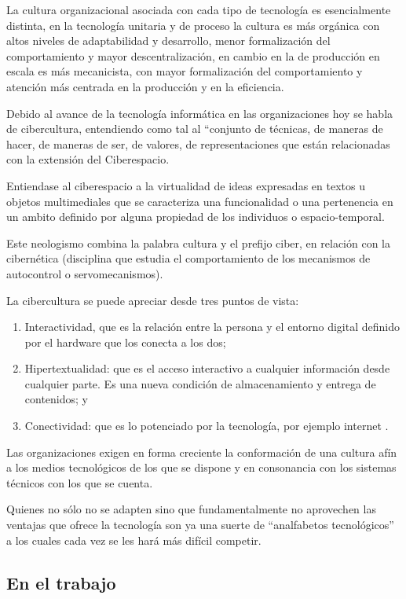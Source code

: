 \documentclass[a4paper, 12pt]{article}
\begin{document}
La cultura organizacional asociada con cada tipo de tecnología es esencialmente distinta, en la tecnología unitaria y de proceso la cultura es más orgánica con altos niveles de adaptabilidad y desarrollo, menor formalización del comportamiento y mayor descentralización, en cambio en la de producción en escala es más mecanicista, con mayor formalización del comportamiento y atención más centrada en la producción y en la eficiencia.

Debido al avance de la tecnología informática en las organizaciones hoy se habla de cibercultura, entendiendo como tal al “conjunto de técnicas, de maneras de hacer, de maneras de ser, de valores, de representaciones que están relacionadas con la extensión del Ciberespacio.

Entiendase al ciberespacio a la virtualidad de ideas expresadas en textos u objetos multimediales  que  se caracteriza una funcionalidad o una pertenencia en un ambito definido por alguna propiedad de los individuos o espacio-temporal.

Este neologismo combina la palabra cultura y el prefijo ciber, en relación con la cibernética (disciplina que estudia el comportamiento de los mecanismos de autocontrol o servomecanismos).

La cibercultura se puede apreciar desde tres puntos de vista:

\begin{enumerate}
\item Interactividad, que es la relación entre la persona y el entorno digital definido por el hardware que los conecta a los dos;
\item Hipertextualidad: que es el acceso interactivo a cualquier información desde cualquier parte. Es una nueva condición de almacenamiento y entrega de contenidos; y
\item Conectividad: que es lo potenciado por la tecnología, por ejemplo internet .
\end{enumerate}

Las organizaciones exigen en forma creciente la conformación de una cultura afín a los medios tecnológicos de los que se dispone y en consonancia con los sistemas técnicos con los que se cuenta. 

Quienes no sólo no se adapten sino que fundamentalmente no aprovechen las ventajas que ofrece la tecnología son ya una suerte de “analfabetos tecnológicos” a los cuales cada vez se les hará más difícil competir.

\subsection{En el trabajo}
\end{document}

